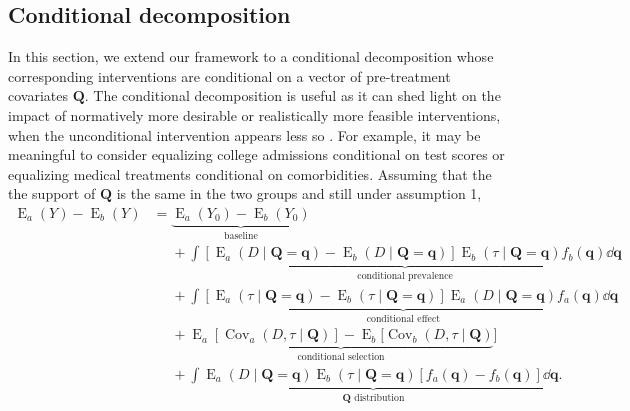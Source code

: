 \documentclass[12pt,a4paper]{article}
\newcommand{\Cov}{\operatorname{Cov}}
\newcommand{\E}{\operatorname{E}}
\def\Q{{\boldsymbol Q}}
\def\q{{\boldsymbol q}}
\begin{document}
\subsection{Conditional decomposition}
In this section, we extend our framework to a conditional decomposition whose corresponding interventions are conditional on a vector of pre-treatment covariates $\boldsymbol{Q}$. The conditional decomposition is useful as it can shed light on the impact of normatively more desirable or realistically more feasible interventions, when the unconditional intervention appears less so \citep{jackson_meaningful_2021}. For example, it may be meaningful to consider equalizing college admissions conditional on test scores or equalizing medical treatments conditional on comorbidities.
Assuming that the the support of $\Q$ is the same in the two groups and still under assumption 1,
\begin{align}
    \E_a(Y)-\E_b(Y) &= \underbrace{\E_a(Y_0)-\E_b(Y_0)}_{\text{baseline}} \nonumber \\
    &\phantom{{}={}} + \underbrace{\int [\E_a(D \mid \Q=\q)-\E_b(D \mid \Q=\q)]\E_b(\tau \mid \Q=\q) f_b(\q) \dd \q}_{\text{conditional prevalence}} \nonumber \\
    &\phantom{{}={}} + \underbrace{\int [\E_a(\tau \mid \Q=\q)-\E_b(\tau \mid \Q=\q)] \E_a(D \mid \Q=\q) f_a(\q) \dd \q}_{\text{conditional effect}} \nonumber \\
    &\phantom{{}={}} + \underbrace{\E_a[\Cov_a(D, \tau \mid \Q)] - \E_b[\Cov_b(D, \tau \mid \Q)}_{\text{conditional selection}}] \nonumber \\
    &\phantom{{}={}} + \underbrace{\int \E_a(D \mid \Q=\q) \E_b(\tau \mid \Q=\q) [f_a(\q)-f_b(\q)] \dd \q}_{\text{$\Q$ distribution}}.
\end{align}
\end{document}
